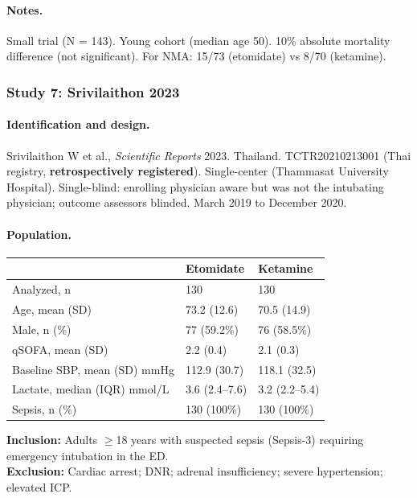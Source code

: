\documentclass[11pt]{article}
\begin{document}
\paragraph{Notes.}
Small trial (N = 143). Young cohort (median age 50). 10\% absolute mortality difference (not significant). For NMA: 15/73 (etomidate) vs 8/70 (ketamine).

\bigskip

\subsubsection{Study 7: Srivilaithon 2023}

\paragraph{Identification and design.}
Srivilaithon W et al., \textit{Scientific Reports} 2023. Thailand. TCTR20210213001 (Thai registry, \textbf{retrospectively registered}). Single-center (Thammasat University Hospital). Single-blind: enrolling physician aware but was not the intubating physician; outcome assessors blinded. March 2019 to December 2020.

\paragraph{Population.}

\begin{table}[H]
\centering\footnotesize
\begin{tabularx}{\textwidth}{L{4cm} C{3cm} C{3cm}}
\toprule
& \textbf{Etomidate} & \textbf{Ketamine} \\
\midrule
Analyzed, n & 130 & 130 \\
Age, mean (SD) & 73.2 (12.6) & 70.5 (14.9) \\
Male, n (\%) & 77 (59.2\%) & 76 (58.5\%) \\
qSOFA, mean (SD) & 2.2 (0.4) & 2.1 (0.3) \\
Baseline SBP, mean (SD) mmHg & 112.9 (30.7) & 118.1 (32.5) \\
Lactate, median (IQR) mmol/L & 3.6 (2.4--7.6) & 3.2 (2.2--5.4) \\
Sepsis, n (\%) & 130 (100\%) & 130 (100\%) \\
\bottomrule
\end{tabularx}
\end{table}

\noindent\textbf{Inclusion:} Adults $\geq$18 years with suspected sepsis (Sepsis-3) requiring emergency intubation in the ED.\\
\textbf{Exclusion:} Cardiac arrest; DNR; adrenal insufficiency; severe hypertension; elevated ICP.
\end{document}

